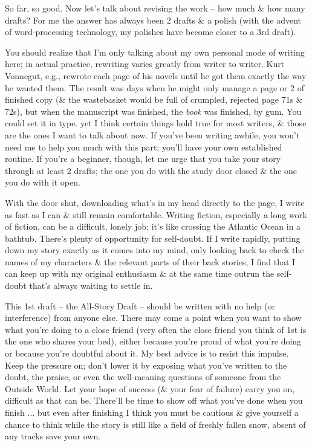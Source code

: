 \documentclass{article}
\numberwithin{equation}{section}
\begin{document}
 So far, so good. Now let's talk about revising the work -- how much \& how many drafts? For me the answer has always been 2 drafts \& a polish (with the advent of word-processing technology, my polishes have become closer to a 3rd draft).

You should realize that I'm only talking about my own personal mode of writing here; in actual practice, rewriting varies greatly from writer to writer. Kurt Vonnegut, e.g., rewrote each page of his novels until he got them exactly the way he wanted them. The result was days when he might only manage a page or 2 of finished copy (\& the wastebasket would be full of crumpled, rejected page 71s \& 72s), but when the manuscript was finished, the \textit{book} was finished, by gum. You could set it in type. yet I think certain things hold true for most writers, \& those are the ones I want to talk about now. If you've been writing awhile, you won't need me to help you much with this part; you'll have your own established routine. If you're a beginner, though, let me urge that you take your story through at least 2 drafts; the one you do with the study door closed \& the one you do with it open.

With the door shut, downloading what's in my head directly to the page, I write as fast as I can \& still remain comfortable. Writing fiction, especially a long work of fiction, can be a difficult, lonely job; it's like crossing the Atlantic Ocean in a bathtub. There's plenty of opportunity for self-doubt. If I write rapidly, putting down my story exactly as it comes into my mind, only looking back to check the names of my characters \& the relevant parts of their back stories, I find that I can keep up with my original enthusiasm \& at the same time outrun the self-doubt that's always waiting to settle in.

This 1st draft -- the All-Story Draft -- should be written with no help (or interference) from anyone else. There may come a point when you want to show what you're doing to a close friend (very often the close friend you think of 1st is the one who shares your bed), either because you're proud of what you're doing or because you're doubtful about it. My best advice is to resist this impulse. Keep the pressure on; don't lower it by exposing what you've written to the doubt, the praise, or even the well-meaning questions of someone from the Outside World. Let your hope of success (\& your fear of failure) carry you on, difficult as that can be. There'll be time to show off what you've done when you finish $\ldots$ but even after finishing I think you must be cautious \& give yourself a chance to think while the story is still like a field of freshly fallen snow, absent of any tracks save your own.
\end{document}
